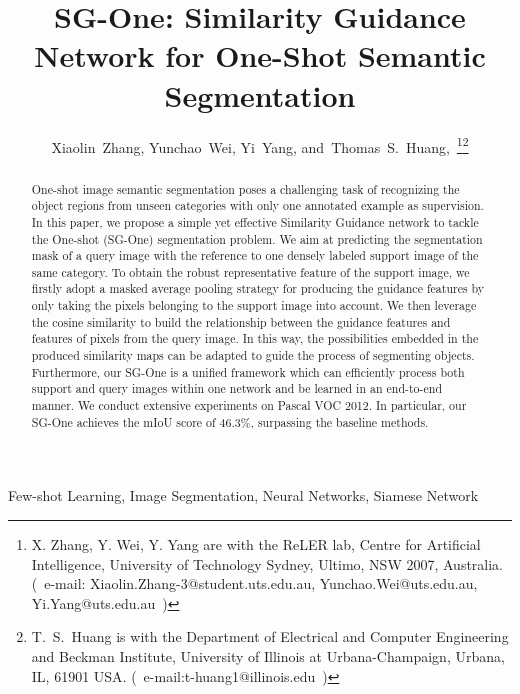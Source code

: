 \documentclass[journal]{IEEEtran}
\begin{document}
\title{SG-One: Similarity Guidance Network for One-Shot Semantic Segmentation}


\author{Xiaolin~Zhang,
        Yunchao~Wei,
        Yi~Yang,
        and~Thomas~S.~Huang,~\thanks{X. Zhang, Y. Wei, Y. Yang are with the ReLER lab, Centre for Artificial Intelligence, University of Technology Sydney, Ultimo, NSW 2007, Australia.
(~e-mail: Xiaolin.Zhang-3@student.uts.edu.au, Yunchao.Wei@uts.edu.au, Yi.Yang@uts.edu.au~)}\thanks{
T.~S.~Huang is with the Department of Electrical and Computer Engineering and Beckman Institute, University of Illinois at Urbana-Champaign, Urbana, IL, 61901 USA. (~e-mail:t-huang1@illinois.edu~)}
}




\maketitle


\begin{abstract}
One-shot image semantic segmentation poses a challenging task of recognizing the object regions from unseen categories with only one annotated example as supervision.
In this paper, we propose a simple yet effective Similarity Guidance network to tackle the One-shot (SG-One) segmentation problem. 
We aim at predicting the segmentation mask of a query image with the reference to one densely labeled support image of the same category.
To obtain the robust representative feature of the support image, we firstly adopt a masked average pooling strategy for producing the guidance features by only taking the pixels belonging to the support image into account.
We then leverage the cosine similarity to build the relationship between the guidance features and features of pixels from the query image. 
In this way, the possibilities embedded in the produced similarity maps can be adapted to guide the process of segmenting objects. 
Furthermore, our SG-One is a unified framework which can efficiently process both support and query images within one network and be learned in an end-to-end manner.
We conduct extensive experiments on Pascal VOC 2012. In particular, our SG-One achieves the mIoU score of 46.3\%, surpassing the baseline methods.


\end{abstract}

\begin{IEEEkeywords}
Few-shot Learning, Image Segmentation, Neural Networks, Siamese Network
\end{IEEEkeywords}
\end{document}
